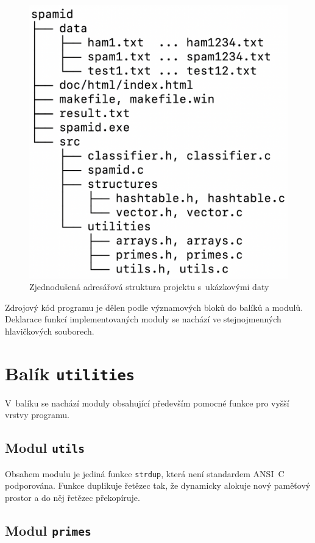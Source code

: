 \documentclass[a4paper, 12pt]{report}
\begin{document}
\begin{figure}
    \centering
    \includegraphics[width=.75\textwidth]{project-tree-simplified}
    \caption{Zjednodušená adresářová struktura projektu s~ukázkovými daty}
    \label{fig:project-tree-simplified}
\end{figure}

Zdrojový kód programu je dělen podle významových bloků do balíků a modulů. 
Deklarace funkcí implementovaných moduly se nachází ve stejnojmenných 
hlavičkových souborech.

\section{Balík \texttt{utilities}}

V~balíku se nachází moduly obsahující především pomocné funkce pro vyšší 
vrstvy programu.

\subsection{Modul \texttt{utils}}

Obsahem modulu je jediná funkce \texttt{strdup}, která není standardem 
ANSI~C podporována. Funkce duplikuje řetězec tak, že dynamicky alokuje 
nový paměťový prostor a do něj řetězec překopíruje.

\subsection{Modul \texttt{primes}}
\end{document}
